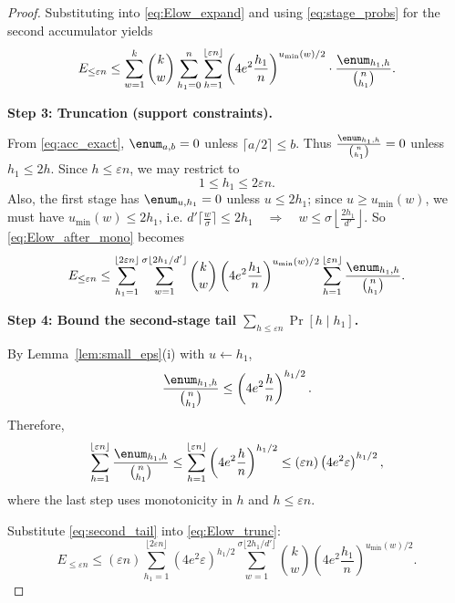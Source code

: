 \begin{proof}
Substituting into \eqref{eq:Elow_expand} and using \eqref{eq:stage_probs} for
the second accumulator yields
\begin{equation}
\label{eq:Elow_after_mono}
E_{\le \varepsilon n}
\le
\sum_{w=1}^{k}\binom{k}{w}
\sum_{h_1=0}^{n}\sum_{h=1}^{\lfloor \varepsilon n\rfloor}
\left(4e^2\frac{h_1}{n}\right)^{u_{\min}(w)/2}
\cdot
\frac{\enum_{h_1,h}}{\binom{n}{h_1}}.
\end{equation}


\noindent\textbf{Step 3: Truncation (support constraints).}

From \eqref{eq:acc_exact}, $\enum_{a,b}=0$ unless $\lceil a/2\rceil\le b$.
Thus $\frac{\enum_{h_1,h}}{\binom{n}{h_1}}=0$ unless $h_1\le 2h$.
Since $h\le \varepsilon n$, we may restrict to
\begin{equation}
\label{eq:h1_range}
1\le h_1 \le 2\varepsilon n.
\end{equation}
Also, the first stage has $\enum_{u,h_1}=0$ unless $u\le 2h_1$; since
$u\ge u_{\min}(w)$, we must have $u_{\min}(w)\le 2h_1$, i.e.
$
d'\Big\lceil \frac{w}{\sigma}\Big\rceil \le 2h_1
\quad\Rightarrow\quad
w \le \sigma\left\lfloor\frac{2h_1}{d'}\right\rfloor.
$
So \eqref{eq:Elow_after_mono} becomes
\begin{equation}
\label{eq:Elow_trunc}
E_{\le \varepsilon n}
\le
\sum_{h_1=1}^{\lfloor 2\varepsilon n\rfloor}
\sum_{w=1}^{\sigma\lfloor 2h_1/d'\rfloor}\binom{k}{w}
\left(4e^2\frac{h_1}{n}\right)^{u_{\min}(w)/2}
\sum_{h=1}^{\lfloor \varepsilon n\rfloor}
\frac{\enum_{h_1,h}}{\binom{n}{h_1}}.
\end{equation}

\noindent\textbf{Step 4: Bound the second-stage tail $\sum_{h\le \varepsilon n}\Pr[h\mid h_1]$.}

By Lemma~\ref{lem:small_eps}(i) with $u\leftarrow h_1$,
\[
\frac{\enum_{h_1,h}}{\binom{n}{h_1}}
\le
\left(4e^2\frac{h}{n}\right)^{h_1/2}.
\]
Therefore,
\begin{equation}
\label{eq:second_tail}
\sum_{h=1}^{\lfloor \varepsilon n\rfloor}\frac{\enum_{h_1,h}}{\binom{n}{h_1}}
\le
\sum_{h=1}^{\lfloor \varepsilon n\rfloor}\left(4e^2\frac{h}{n}\right)^{h_1/2}
\le
(\varepsilon n)\left(4e^2\varepsilon\right)^{h_1/2},
\end{equation}
where the last step uses monotonicity in $h$ and $h\le \varepsilon n$.

Substitute \eqref{eq:second_tail} into \eqref{eq:Elow_trunc}:
\begin{equation}
\label{eq:Elow_mid}
E_{\le \varepsilon n}
\le
(\varepsilon n)
\sum_{h_1=1}^{\lfloor 2\varepsilon n\rfloor}
\left(4e^2\varepsilon\right)^{h_1/2}
\sum_{w=1}^{\sigma\lfloor 2h_1/d'\rfloor}\binom{k}{w}
\left(4e^2\frac{h_1}{n}\right)^{u_{\min}(w)/2}.
\end{equation}


\end{proof}
